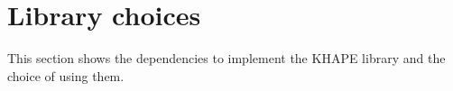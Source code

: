 \documentclass[../report.tex]{subfiles}
\begin{document}
% 
% 
% 
% 
% 
% 
% 
% 
% 
% 
% 
% 



\section{Library choices}

This section shows the dependencies to implement the KHAPE library and the choice of using them.
\end{document}
